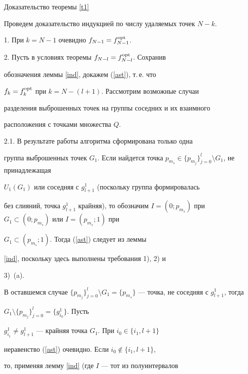 \begin{pf*}{Доказательство теоремы \ref{t1}}


Проведем доказательство индукцией по числу удаляемых точек $N-k$.





1. При $k=N-1$ очевидно $f_{N-1}=f_{N-1}^{\operatorname{opt}}$.





2. Пусть в условиях теоремы $f_{N-l}=f_{N-l}^{\operatorname{opt}}$. Сохранив


обозначения леммы \ref{ind}, докажем (\ref{ast}), т.\,е. что


$f_k=f_k^{\operatorname{opt}}$ при $k=N-(l+1)$. Рассмотрим возможные случаи


разделения выброшенных точек на группы соседних и их взаимного


расположения с точками множества $Q$.





2.1. В результате работы алгоритма сформирована только одна


группа выброшенных точек $G_1$. Если найдется точка $p_{m_s}


\in \{p_{m_j}\}_{j=0}^{l}\setminus G_1$, не принадлежащая


$U_1(G_1)$ или соседняя с $g_{l+1}^1$ (поскольку группа формировалась


без слияний, точка $g_{l+1}^1$ крайняя), то обозначим $I=(0;


p_{m_s})$ при $G_1\subset (0; p_{m_s})$ или $I=(p_{m_s};1)$ при


$G_1\subset (p_{m_s};1)$. Тогда (\ref{ast}) следует из леммы


\ref{ind}, поскольку здесь выполнены требования 1), 2) и


3)~(a).





В оставшемся случае $\{p_{m_j}\}_{j=0}^{l}\setminus


G_1=\{p_{m_s}\}$ --- точка, не соседняя с $g_{l+1}^1$, тогда


$G_1\setminus\{p_{m_j}\}_{j=0}^{l} =\{g_{i_0}^1\}$. Пусть


$g_{i_1}^1\neq g_{l+1}^1$ --- крайняя точка $G_1$. При $i_0 \in \{i_1,l+1\}$


неравенство (\ref{ast}) очевидно. Если $i_0 \notin \{i_1,l+1\}$,


то, применяя лемму \ref{ind} (где $I$ --- тот из полуинтервалов



\end{pf*}
